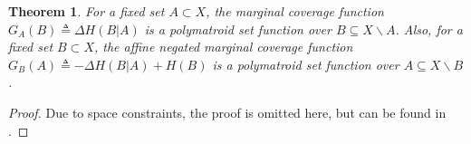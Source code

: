 \documentclass[letterpaper, 10 pt, conference]{ieeeconf}
\newtheorem{theorem}{Theorem}
\begin{document}
\begin{theorem}\label{Th:SubmodularityOfMarginalCoverage}
For a fixed set $A \subset X$, the marginal coverage function $G_A(B) \triangleq \Delta H (B \vert A)$ is a polymatroid set function over $B \subseteq X \backslash A$. Also, for a fixed set $B \subset X$, the affine negated marginal coverage function $G_B(A) \triangleq -\Delta H (B \vert A)+H(B)$ is a polymatroid set function over $A \subseteq X \backslash B$.
\end{theorem} 
\begin{proof}
Due to space constraints, the proof is omitted here, but can be found in \cite{Welikala2024Ax1}. 
\end{proof}

\end{document}
